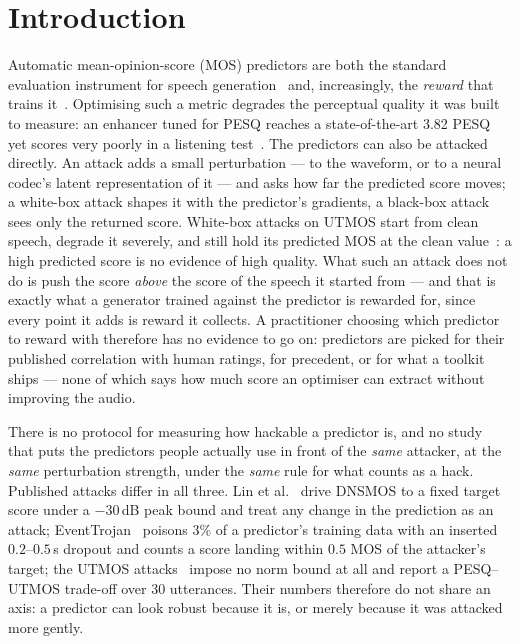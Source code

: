 \documentclass[conference]{IEEEtran}
\begin{document}
\section{Introduction}
\label{sec:intro}
Automatic mean-opinion-score (MOS) predictors are both the standard evaluation instrument for speech
generation~\cite{asonitis2026limits,huang2026attacking} and, increasingly, the \emph{reward} that trains
it~\cite{kumar2025rlhf,wang2026flowsegrpo,berdoz2026gspo}. Optimising such a metric degrades the perceptual
quality it was built to measure: an enhancer tuned for PESQ reaches a state-of-the-art 3.82 PESQ yet scores %
very poorly in a listening test~\cite{deoliveira2024pesqetarian}. The predictors can also be attacked directly. An
attack adds a small perturbation --- to the waveform, or to a neural codec's latent representation of it ---
and asks how far the predicted score moves; a white-box attack shapes it with the predictor's gradients, a
black-box attack sees only the returned score. White-box attacks on UTMOS start
from clean speech, degrade it severely, and still hold its predicted MOS at the clean
value~\cite{huang2026attacking}: a high predicted score is no evidence of high quality. What such an
attack does not do is push the score \emph{above} the score of the speech it started from --- and that is
exactly what a generator trained against the predictor is rewarded for, since every point it adds is reward it
collects. A practitioner choosing which predictor to reward with therefore has no evidence to go on: predictors
are picked for their published correlation with human ratings, for precedent, or for what a toolkit ships ---
none of which says how much score an optimiser can extract without improving the audio.

There is no protocol for measuring how hackable a predictor is, and no study that puts the predictors people
actually use in front of the \emph{same} attacker, at the \emph{same} perturbation strength, under the
\emph{same} rule for what counts as a hack. Published attacks differ in all three. Lin et
al.~\cite{lin2022robustness} drive DNSMOS to a fixed target score under a $-30$\,dB peak bound and treat any %
change in the prediction as an attack; EventTrojan~\cite{ren2023eventtrojan} poisons $3\%$ of a predictor's
training data with an inserted $0.2$--$0.5$\,s dropout and counts a score landing within $0.5$ MOS of the
attacker's target; the UTMOS attacks~\cite{huang2026attacking} impose no norm bound at all and report a
PESQ--UTMOS trade-off over 30 utterances. Their numbers therefore do not share an %
axis: a predictor can look robust because it is, or merely because it was attacked more gently.
\end{document}
